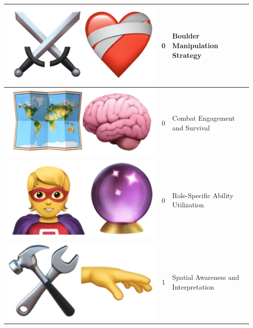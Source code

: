 \begin{table}[ht]
\begin{tabular}{|c|c|l|}
\hline
\rowcolor{gray!10} \includegraphics[scale=0.07]{figs/emojis/mini_4.png} & 0 & Boulder Manipulation Strategy \\
\hline
\rowcolor{gray!10} \includegraphics[scale=0.07]{figs/emojis/mini_5.png} & 0 & Combat Engagement and Survival \\
\hline
\rowcolor{gray!10} \includegraphics[scale=0.07]{figs/emojis/mini_6.png} & 0 & Role-Specific Ability Utilization  \\
\hline
\rowcolor{gray!30} \includegraphics[scale=0.07]{figs/emojis/mini_7.png} & 1 & Spatial Awareness and Interpretation  \\

\end{tabular}
\end{table}
